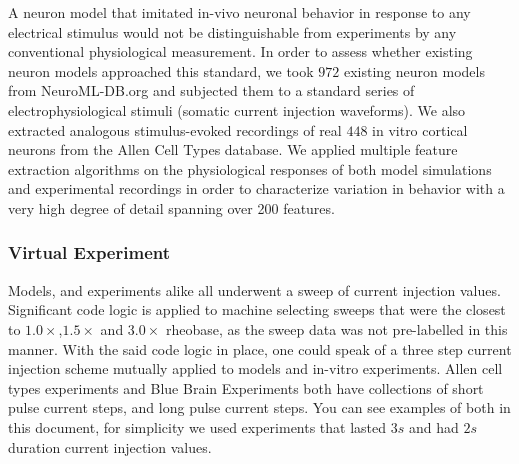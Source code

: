 A neuron model that imitated in-vivo neuronal behavior in response to any electrical stimulus would not be distinguishable from experiments by any conventional physiological measurement. In order to assess whether existing neuron models approached this standard, we took $972$ existing neuron models from NeuroML-DB.org and subjected them to a standard series of electrophysiological stimuli (somatic current injection waveforms). We also extracted analogous stimulus-evoked recordings of real $448$ in vitro cortical neurons from the Allen Cell Types database. We applied multiple feature extraction algorithms on the physiological responses of both model simulations and experimental recordings in order to characterize variation in behavior with a very high degree of detail spanning over 200 features.
\subsubsection{Virtual Experiment} 
Models, and experiments alike all underwent a sweep of current injection values. Significant code logic is applied to machine selecting sweeps that were the closest to $1.0\times $,$1.5\times$ and $3.0 \times$ rheobase, as the sweep data was not pre-labelled in this manner. With the said code logic in place, one could speak of a three step current injection scheme  mutually applied to models and in-vitro experiments. 
Allen cell types experiments and Blue Brain Experiments both have collections of short pulse current steps, and long pulse current steps. You can see examples of both in this document, for simplicity we used experiments that lasted $3s$ and had $2s$ duration current injection values.

%